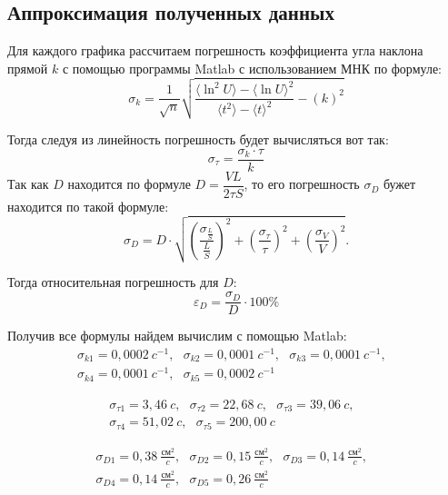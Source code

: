 \documentclass[a4paper,12pt]{article}
\begin{document}
\subsection{Аппроксимация полученных данных}

Для каждого графика рассчитаем погрешность коэффициента угла наклона прямой $k$ с помощью программы  Matlab с использованием МНК по формуле:
\begin{equation}
	\sigma_k = \dfrac{1}{\sqrt{n}} \sqrt{\dfrac{\langle\ln^2 U\rangle - \langle\ln U\rangle^2}{\langle t^2\rangle - \langle t\rangle^2} - \left(k\right)^2}  
\end{equation}

Тогда следуя из линейность погрешность будет вычисляться вот так:
\begin{equation}
	\sigma_\tau = \dfrac{\sigma_k\cdot \tau}{k}
\end{equation}
Так как $D$ находится по формуле $D = \dfrac{VL}{2 \tau S}$, то его погрешность $\sigma_D$ бужет находится по такой формуле:
\begin{equation}
	\sigma_D = D \cdot \sqrt{\left(\dfrac{\sigma_{\frac{L}{S}}}{\frac{L}{S}}\right)^2 + \left(\dfrac{\sigma_{\tau}}{\tau}\right)^2 + \left(\dfrac{\sigma_V}{V}\right)^2}.
\end{equation}

Тогда относительная погрешность для $D$:
\begin{equation}
	\varepsilon_D = \frac{\sigma_D}{D}\cdot 100\%
\end{equation}

Получив все формулы найдем вычислим с помощью Matlab:
\begin{multline}
	\sigma_{k1} = 0,0002\ c^{-1},~~~\sigma_{k2} = 0,0001\  c^{-1},~~~\sigma_{k3} = 0,0001\ c^{-1},~~~\\
	\sigma_{k4} = 0,0001\ c^{-1},~~~\sigma_{k5} = 0,0002\ c^{-1}~~~
\end{multline}

\begin{multline}
	\sigma_{\tau 1} = 3,46\ c,~~~\sigma_{\tau 2} = 22,68\ c,~~~\sigma_{\tau 3} = 39,06\ c,~~~\\
	\sigma_{\tau 4} = 51,02\ c,~~~\sigma_{\tau 5} = 200,00\ c~~~
\end{multline}

\begin{multline}
	\sigma_{D1} = 0,38\ \frac{\text{см}^2}{c},~~~\sigma_{D2} = 0,15\ \frac{\text{см}^2}{c},~~~\sigma_{D3} = 0,14\ \frac{\text{см}^2}{c},~~~\\
	\sigma_{D4} = 0,14\ \frac{\text{см}^2}{c},~~~\sigma_{D5} = 0,26\ \frac{\text{см}^2}{c}~~~
\end{multline}
\end{document}
